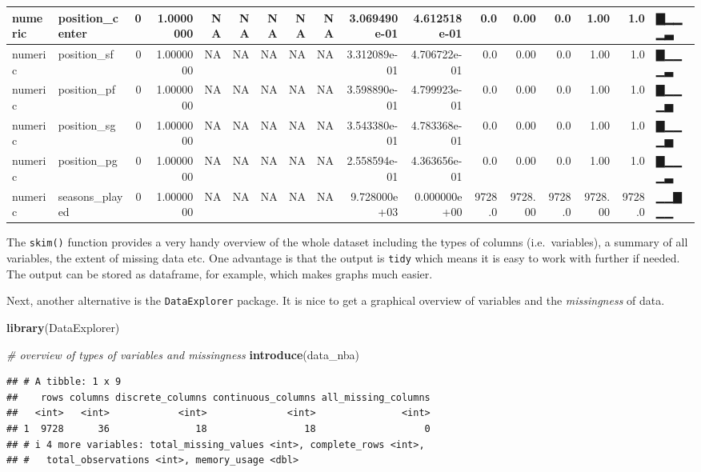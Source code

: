 \documentclass[
]{book}
\newenvironment{Shaded}{\begin{snugshade}}{\end{snugshade}}
\newcommand{\CommentTok}[1]{\textcolor[rgb]{0.56,0.35,0.01}{\textit{#1}}}
\newcommand{\FunctionTok}[1]{\textcolor[rgb]{0.13,0.29,0.53}{\textbf{#1}}}
\newcommand{\NormalTok}[1]{#1}
\begin{document}
\begin{tabular}{l|l|r|r|r|r|r|r|r|r|r|r|r|r|r|r|l}
\hline
numeric & position\_center & 0 & 1.0000000 & NA & NA & NA & NA & NA & 3.069490e-01 & 4.612518e-01 & 0.0 & 0.00 & 0.0 & 1.00 & 1.0 & ▇▁▁▁▃\\
\hline
numeric & position\_sf & 0 & 1.0000000 & NA & NA & NA & NA & NA & 3.312089e-01 & 4.706722e-01 & 0.0 & 0.00 & 0.0 & 1.00 & 1.0 & ▇▁▁▁▃\\
\hline
numeric & position\_pf & 0 & 1.0000000 & NA & NA & NA & NA & NA & 3.598890e-01 & 4.799923e-01 & 0.0 & 0.00 & 0.0 & 1.00 & 1.0 & ▇▁▁▁▅\\
\hline
numeric & position\_sg & 0 & 1.0000000 & NA & NA & NA & NA & NA & 3.543380e-01 & 4.783368e-01 & 0.0 & 0.00 & 0.0 & 1.00 & 1.0 & ▇▁▁▁▅\\
\hline
numeric & position\_pg & 0 & 1.0000000 & NA & NA & NA & NA & NA & 2.558594e-01 & 4.363656e-01 & 0.0 & 0.00 & 0.0 & 1.00 & 1.0 & ▇▁▁▁▃\\
\hline
numeric & seasons\_played & 0 & 1.0000000 & NA & NA & NA & NA & NA & 9.728000e+03 & 0.000000e+00 & 9728.0 & 9728.00 & 9728.0 & 9728.00 & 9728.0 & ▁▁▇▁▁\\
\hline
\end{tabular}

The \texttt{skim()} function provides a very handy overview of the whole dataset including the types of columns (i.e.~variables), a summary of all variables, the extent of missing data etc. One advantage is that the output is \texttt{tidy} which means it is easy to work with further if needed. The output can be stored as dataframe, for example, which makes graphs much easier.

Next, another alternative is the \texttt{DataExplorer} package. It is nice to get a graphical overview of variables and the \emph{missingness} of data.

\begin{Shaded}
\begin{Highlighting}[]
\FunctionTok{library}\NormalTok{(DataExplorer)}

\CommentTok{\# overview of types of variables and missingness}
\FunctionTok{introduce}\NormalTok{(data\_nba)}
\end{Highlighting}
\end{Shaded}

\begin{verbatim}
## # A tibble: 1 x 9
##    rows columns discrete_columns continuous_columns all_missing_columns
##   <int>   <int>            <int>              <int>               <int>
## 1  9728      36               18                 18                   0
## # i 4 more variables: total_missing_values <int>, complete_rows <int>,
## #   total_observations <int>, memory_usage <dbl>
\end{verbatim}
\end{document}
